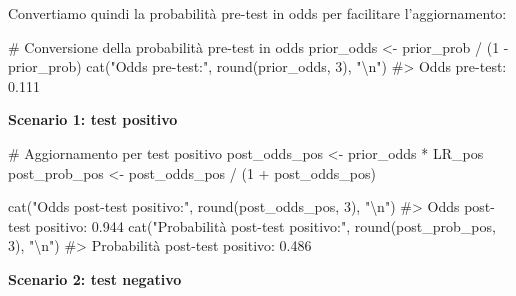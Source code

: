 \documentclass[
  letterpaper,
  DIV=11,
  numbers=noendperiod,
  oneside]{scrreprt}
\newenvironment{Shaded}{\begin{snugshade}}{\end{snugshade}}
\newcommand{\CommentTok}[1]{\textcolor[rgb]{0.37,0.37,0.37}{#1}}
\newcommand{\DecValTok}[1]{\textcolor[rgb]{0.68,0.00,0.00}{#1}}
\newcommand{\FunctionTok}[1]{\textcolor[rgb]{0.28,0.35,0.67}{#1}}
\newcommand{\NormalTok}[1]{\textcolor[rgb]{0.00,0.23,0.31}{#1}}
\newcommand{\OtherTok}[1]{\textcolor[rgb]{0.00,0.23,0.31}{#1}}
\newcommand{\SpecialCharTok}[1]{\textcolor[rgb]{0.37,0.37,0.37}{#1}}
\newcommand{\StringTok}[1]{\textcolor[rgb]{0.13,0.47,0.30}{#1}}
\theoremstyle{definition}
\theoremstyle{plain}
\theoremstyle{definition}
\theoremstyle{remark}
\begin{document}
Convertiamo quindi la probabilità pre-test in odds per facilitare
l'aggiornamento:

\begin{Shaded}
\begin{Highlighting}[]
\CommentTok{\# Conversione della probabilità pre{-}test in odds}
\NormalTok{prior\_odds }\OtherTok{\textless{}{-}}\NormalTok{ prior\_prob }\SpecialCharTok{/}\NormalTok{ (}\DecValTok{1} \SpecialCharTok{{-}}\NormalTok{ prior\_prob)}
\FunctionTok{cat}\NormalTok{(}\StringTok{"Odds pre{-}test:"}\NormalTok{, }\FunctionTok{round}\NormalTok{(prior\_odds, }\DecValTok{3}\NormalTok{), }\StringTok{"}\SpecialCharTok{\textbackslash{}n}\StringTok{"}\NormalTok{)}
\CommentTok{\#\textgreater{} Odds pre{-}test: 0.111}
\end{Highlighting}
\end{Shaded}

\textbf{Scenario 1: test positivo}

\begin{Shaded}
\begin{Highlighting}[]
\CommentTok{\# Aggiornamento per test positivo}
\NormalTok{post\_odds\_pos }\OtherTok{\textless{}{-}}\NormalTok{ prior\_odds }\SpecialCharTok{*}\NormalTok{ LR\_pos}
\NormalTok{post\_prob\_pos }\OtherTok{\textless{}{-}}\NormalTok{ post\_odds\_pos }\SpecialCharTok{/}\NormalTok{ (}\DecValTok{1} \SpecialCharTok{+}\NormalTok{ post\_odds\_pos)}

\FunctionTok{cat}\NormalTok{(}\StringTok{"Odds post{-}test positivo:"}\NormalTok{, }\FunctionTok{round}\NormalTok{(post\_odds\_pos, }\DecValTok{3}\NormalTok{), }\StringTok{"}\SpecialCharTok{\textbackslash{}n}\StringTok{"}\NormalTok{)}
\CommentTok{\#\textgreater{} Odds post{-}test positivo: 0.944}
\FunctionTok{cat}\NormalTok{(}\StringTok{"Probabilità post{-}test positivo:"}\NormalTok{, }\FunctionTok{round}\NormalTok{(post\_prob\_pos, }\DecValTok{3}\NormalTok{), }\StringTok{"}\SpecialCharTok{\textbackslash{}n}\StringTok{"}\NormalTok{)}
\CommentTok{\#\textgreater{} Probabilità post{-}test positivo: 0.486}
\end{Highlighting}
\end{Shaded}

\textbf{Scenario 2: test negativo}
\end{document}
